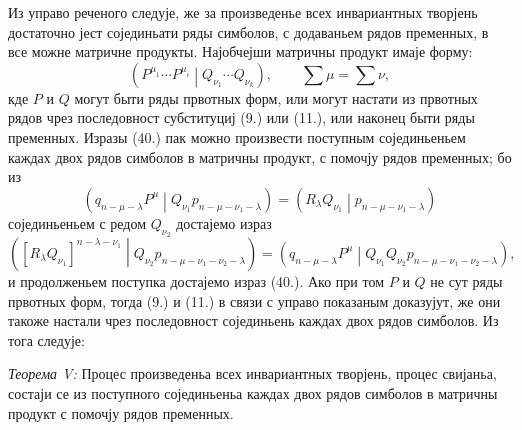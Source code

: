 ﻿\documentclass[11pt]{article}
\newcommand{\pair}[2]{\left(#1\middle|#2\right)}
\begin{document}
Из управо реченого следује, же за произведенье всех инвариантных творјень достаточно јест сојединьати ряды симболов, с додаваньем рядов пременных, в все можне матричне продукты. Најобчејши матричны продукт имаје форму:
\begin{equation}
 \pair{P^{\mu_1}\cdots P^{\mu_i}}{Q_{\nu_1}\cdots Q_{\nu_k}},
 \qquad \sum\mu=\sum\nu,
\tag{40}
\end{equation}
кде $P$ и $Q$ могут быти ряды првотных форм, или могут настати из првотных рядов чрез последовност субституциј (9.) или (11.), или наконец быти ряды пременных. Изразы (40.) пак можно произвести поступным сојединьеньем каждах двох рядов симболов в матричны продукт, с помочју рядов пременных; бо из
\[
 \pair{q_{n-\mu-\lambda}P^\mu}{Q_{\nu_1}p_{n-\mu-\nu_1-\lambda}}
 =\pair{R_\lambda Q_{\nu_1}}{p_{n-\mu-\nu_1-\lambda}}
\]
сојединьеньем с редом $Q_{\nu_2}$ достајемо израз
\[
 \pair{[R_\lambda Q_{\nu_1}]^{n-\lambda-\nu_1}}
 {Q_{\nu_2}p_{n-\mu-\nu_1-\nu_2-\lambda}}
 =\pair{q_{n-\mu-\lambda}P^\mu}
 {Q_{\nu_1}Q_{\nu_2}p_{n-\mu-\nu_1-\nu_2-\lambda}},
\]
и продолженьем поступка достајемо израз (40.). Ако при том $P$ и $Q$ не сут ряды првотных форм, тогда (9.) и (11.) в связи с управо показаным доказујут, же они такоже настали чрез последовност сојединьень каждах двох рядов симболов. Из тога следује:

\emph{Теорема V:} Процес произведеньа всех инвариантных творјень, процес свијаньа, состаји се из поступного сојединьеньа каждах двох рядов симболов в матричны продукт с помочју рядов пременных.
\end{document}

